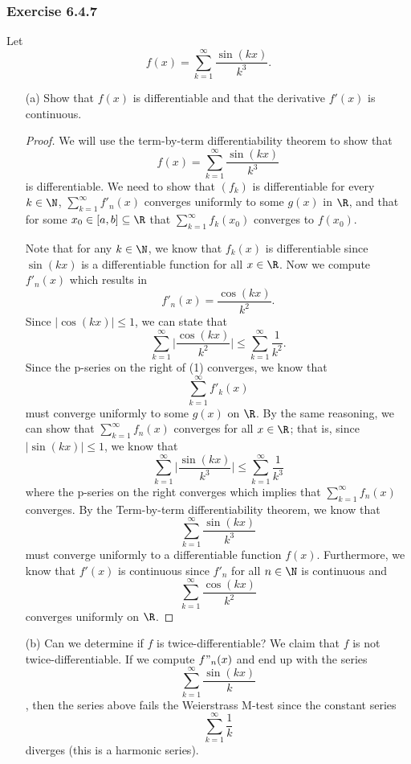 \subsubsection{Exercise 6.4.7} Let 
\[ f(x) = \sum_{ k=1 }^{ \infty  } \frac{ \sin (kx)  }{  k^{3} }.  \]
\begin{enumerate}
    \item[(a)] Show that \( f(x)  \) is differentiable and that the derivative \( f'(x)  \) is continuous. 
        \begin{proof}
        We will use the term-by-term differentiability theorem to show that 
        \[  f(x) = \sum_{ k=1 }^{ \infty  } \frac{ \sin(kx) }{ k^3  }  \]
        is differentiable. We need to show that \( (f_k)  \) is differentiable for every \( k \in \N  \), \( \sum_{ k=1 }^{ \infty  } f'_n(x)  \) converges uniformly to some \( g(x)  \) in \( \R  \), and that for some \( x_0 \in [a,b] \subseteq \R  \) that \( \sum_{ k=1 }^{ \infty  } f_k(x_0)  \) converges to \( f(x_0)  \). 

        Note that for any \(k \in \N  \), we know that \( f_k(x)  \) is differentiable since \( \sin(kx)  \) is a differentiable function for all \( x \in \R  \). Now we compute \( f'_n(x)  \) which results in 
        \[  f'_n(x) = \frac{ \cos(kx)  }{  k^2  }. \]
        Since \( | \cos(kx)  |  \leq 1  \), we can state that 
        \[  \sum_{ k=1 }^{ \infty  } \Big| \frac{ \cos(kx)  }{ k^2  }  \Big|  \leq \sum_{ k=1 }^{ \infty  }  \frac{ 1 }{ k^2  } \tag{1}. \]
        Since the p-series on the right of (1) converges, we know that 
        \[ \sum_{ k=1 }^{ \infty  } f'_k(x)  \] 
        must converge uniformly to some \( g(x)  \) on \( \R  \). By the same reasoning, we can show that \( \sum_{ k=1 }^{ \infty  } f_n(x)  \) converges for all \( x \in \R  \); that is, since \( | \sin(kx)   |  \leq 1  \), we know that
        \[  \sum_{ k=1 }^{ \infty  } \Big| \frac{ \sin(kx)  }{ k^3  }  \Big|  \leq \sum_{ k=1 }^{ \infty  } \frac{ 1 }{ k^3  }  \]
        where the p-series on the right converges which implies that \( \sum_{ k=1 }^{ \infty  } f_n(x)  \) converges. By the Term-by-term differentiability theorem, we know that 
        \[  \sum_{ k=1 }^{ \infty  } \frac{ \sin(kx)  }{ k^3  }   \]
        must converge uniformly to a differentiable function \( f(x) \). Furthermore, we know that \( f'(x)  \) is continuous since \( f'_n  \) for all \( n \in \N  \) is continuous and 
        \[  \sum_{ k=1 }^{ \infty  } \frac{ \cos(kx) }{ k^2  }  \]
        converges uniformly on \( \R  \).
        \end{proof}
    \item[(b)] Can we determine if \( f  \) is twice-differentiable?
        We claim that \( f  \) is not twice-differentiable. If we compute \( f"_n(x)  \) and end up with the series
        \[  \sum_{ k=1 }^{ \infty  } \frac{ \sin(kx)  }{ k }  \]
        , then the series above fails the Weierstrass M-test since the constant series 
        \[ \sum_{ k=1 }^{ \infty  } \frac{ 1 }{ k}  \]
        diverges (this is a harmonic series). 

\end{enumerate}

